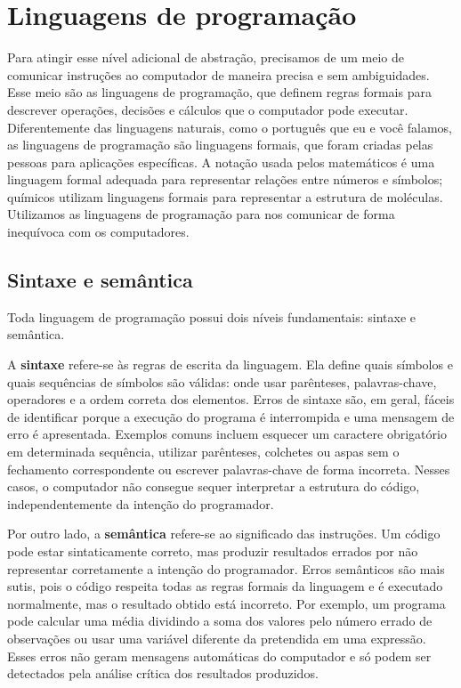 \documentclass[
  brazilian,
  letterpaper,
  DIV=11,
  numbers=noendperiod]{scrreprt}
\begin{document}
\section{Linguagens de
programação}\label{linguagens-de-programauxe7uxe3o}

Para atingir esse nível adicional de abstração, precisamos de um meio de
comunicar instruções ao computador de maneira precisa e sem
ambiguidades. Esse meio são as linguagens de programação, que definem
regras formais para descrever operações, decisões e cálculos que o
computador pode executar. Diferentemente das linguagens naturais, como o
português que eu e você falamos, as linguagens de programação são
linguagens formais, que foram criadas pelas pessoas para aplicações
específicas. A notação usada pelos matemáticos é uma linguagem formal
adequada para representar relações entre números e símbolos; químicos
utilizam linguagens formais para representar a estrutura de moléculas.
Utilizamos as linguagens de programação para nos comunicar de forma
inequívoca com os computadores.

\subsection{Sintaxe e semântica}\label{sintaxe-e-semuxe2ntica}

Toda linguagem de programação possui dois níveis fundamentais: sintaxe e
semântica.

A \textbf{sintaxe} refere-se às regras de escrita da linguagem. Ela
define quais símbolos e quais sequências de símbolos são válidas: onde
usar parênteses, palavras-chave, operadores e a ordem correta dos
elementos. Erros de sintaxe são, em geral, fáceis de identificar porque
a execução do programa é interrompida e uma mensagem de erro é
apresentada. Exemplos comuns incluem esquecer um caractere obrigatório
em determinada sequência, utilizar parênteses, colchetes ou aspas sem o
fechamento correspondente ou escrever palavras-chave de forma incorreta.
Nesses casos, o computador não consegue sequer interpretar a estrutura
do código, independentemente da intenção do programador.

Por outro lado, a \textbf{semântica} refere-se ao significado das
instruções. Um código pode estar sintaticamente correto, mas produzir
resultados errados por não representar corretamente a intenção do
programador. Erros semânticos são mais sutis, pois o código respeita
todas as regras formais da linguagem e é executado normalmente, mas o
resultado obtido está incorreto. Por exemplo, um programa pode calcular
uma média dividindo a soma dos valores pelo número errado de observações
ou usar uma variável diferente da pretendida em uma expressão. Esses
erros não geram mensagens automáticas do computador e só podem ser
detectados pela análise crítica dos resultados produzidos.
\end{document}
